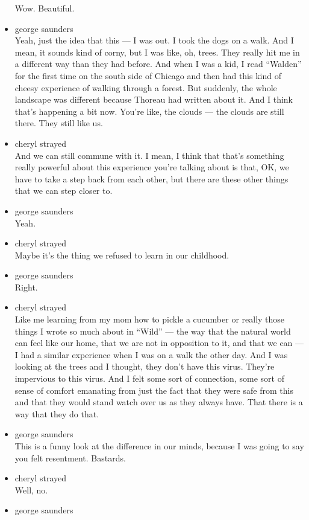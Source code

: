 \begin{itemize}
  Wow. Beautiful.
\item
  george saunders\\
  Yeah, just the idea that this --- I was out. I took the dogs on a
  walk. And I mean, it sounds kind of corny, but I was like, oh, trees.
  They really hit me in a different way than they had before. And when I
  was a kid, I read ``Walden'' for the first time on the south side of
  Chicago and then had this kind of cheesy experience of walking through
  a forest. But suddenly, the whole landscape was different because
  Thoreau had written about it. And I think that's happening a bit now.
  You're like, the clouds --- the clouds are still there. They still
  like us.
\item
  cheryl strayed\\
  And we can still commune with it. I mean, I think that that's
  something really powerful about this experience you're talking about
  is that, OK, we have to take a step back from each other, but there
  are these other things that we can step closer to.
\item
  george saunders\\
  Yeah.
\item
  cheryl strayed\\
  Maybe it's the thing we refused to learn in our childhood.
\item
  george saunders\\
  Right.
\item
  cheryl strayed\\
  Like me learning from my mom how to pickle a cucumber or really those
  things I wrote so much about in ``Wild'' --- the way that the natural
  world can feel like our home, that we are not in opposition to it, and
  that we can --- I had a similar experience when I was on a walk the
  other day. And I was looking at the trees and I thought, they don't
  have this virus. They're impervious to this virus. And I felt some
  sort of connection, some sort of sense of comfort emanating from just
  the fact that they were safe from this and that they would stand watch
  over us as they always have. That there is a way that they do that.
\item
  george saunders\\
  This is a funny look at the difference in our minds, because I was
  going to say you felt resentment. Bastards.
\item
  cheryl strayed\\
  Well, no.
\item
  george saunders\\

\end{itemize}
